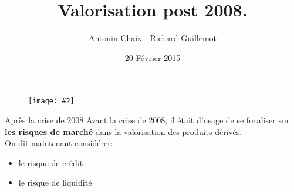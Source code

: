 \documentclass{beamer}
\title[Produits dérivés de taux]{Valorisation post 2008.}
\author{Antonin Chaix - Richard Guillemot}
\institute{Master IFMA}
\date{20 Février 2015}
\newcommand{\FIG}[2]{\texttt{[image: \#2]}}
\begin{document}
\begin{frame}
\titlepage
\begin{figure}[h]
\centering \FIG{5cm}{figures/UPMC_IFMA.jpg}
\end{figure}
\end{frame}

\begin{frame}{Après la crise de 2008}
Avant la crise de 2008, il était d'usage de se focaliser sur \textbf{les risques de marché} dans la valorisation des produits dérivés.\\
\vspace{1cm}
On dit maintenant considérer:
\begin{itemize}
\item le risque de crédit
\item le risque de liquidité
\end{itemize}
\end{frame}
\end{document}
